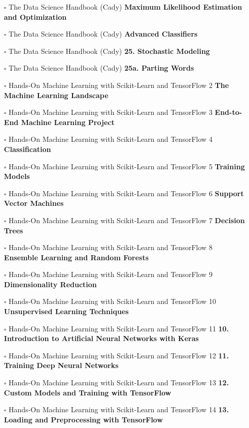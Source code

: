 \documentclass[a4, landscape, 12pt]{article}
\newcommand{\checkbox}{$\square$}%
\begin{document}
\begin{itemize}
{}
\item [\checkbox]  The Data Science Handbook (Cady) \textbf{ Maximum Likelihood Estimation and Optimization
}
\item [\checkbox]  The Data Science Handbook (Cady) \textbf{ Advanced Classifiers
}
\item [\checkbox]  The Data Science Handbook (Cady) \textbf{ 25. Stochastic Modeling
}
\item [\checkbox]  The Data Science Handbook (Cady) \textbf{ 25a. Parting Words
}
\item [\checkbox]  Hands-On Machine Learning with Scikit-Learn and TensorFlow 2 \textbf{ The Machine Learning Landscape
}
\item [\checkbox]  Hands-On Machine Learning with Scikit-Learn and TensorFlow 3 \textbf{ End-to-End Machine Learning Project
}
\item [\checkbox]  Hands-On Machine Learning with Scikit-Learn and TensorFlow 4 \textbf{ Classification
}
\item [\checkbox]  Hands-On Machine Learning with Scikit-Learn and TensorFlow 5 \textbf{ Training Models
}
\item [\checkbox]  Hands-On Machine Learning with Scikit-Learn and TensorFlow 6 \textbf{ Support Vector Machines
}
\item [\checkbox]  Hands-On Machine Learning with Scikit-Learn and TensorFlow 7 \textbf{ Decision Trees
}
\item [\checkbox]  Hands-On Machine Learning with Scikit-Learn and TensorFlow 8 \textbf{ Ensemble Learning and Random Forests
}
\item [\checkbox]  Hands-On Machine Learning with Scikit-Learn and TensorFlow 9 \textbf{ Dimensionality Reduction
}
\item [\checkbox]  Hands-On Machine Learning with Scikit-Learn and TensorFlow 10 \textbf{ Unsupervised Learning Techniques
}
\item [\checkbox]  Hands-On Machine Learning with Scikit-Learn and TensorFlow 11 \textbf{ 10. Introduction to Artificial Neural Networks with Keras
}
\item [\checkbox]  Hands-On Machine Learning with Scikit-Learn and TensorFlow 12 \textbf{ 11. Training Deep Neural Networks
}
\item [\checkbox]  Hands-On Machine Learning with Scikit-Learn and TensorFlow 13 \textbf{ 12. Custom Models and Training with TensorFlow
}
\item [\checkbox]  Hands-On Machine Learning with Scikit-Learn and TensorFlow 14 \textbf{ 13. Loading and Preprocessing with TensorFlow
}
\end{itemize}
\end{document}
